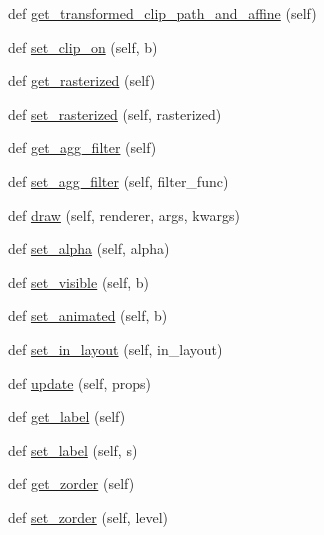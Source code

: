 \begin{DoxyCompactItemize}
\item 
def \hyperlink{classmatplotlib_1_1artist_1_1Artist_a630123b5eb889fc9da7799f3a2faf0bb}{get\+\_\+transformed\+\_\+clip\+\_\+path\+\_\+and\+\_\+affine} (self)
\item 
def \hyperlink{classmatplotlib_1_1artist_1_1Artist_a6179b34cff92122ad9a30a864394638f}{set\+\_\+clip\+\_\+on} (self, b)
\item 
def \hyperlink{classmatplotlib_1_1artist_1_1Artist_aa4ed081e04ee89fd45e5c959018e9031}{get\+\_\+rasterized} (self)
\item 
def \hyperlink{classmatplotlib_1_1artist_1_1Artist_a871b52481eb940ebea0bbb4a9c337f3d}{set\+\_\+rasterized} (self, rasterized)
\item 
def \hyperlink{classmatplotlib_1_1artist_1_1Artist_ab61bb9708059e996384165190df83c5d}{get\+\_\+agg\+\_\+filter} (self)
\item 
def \hyperlink{classmatplotlib_1_1artist_1_1Artist_a5cc2db96730cb274f965afd3f58d719e}{set\+\_\+agg\+\_\+filter} (self, filter\+\_\+func)
\item 
def \hyperlink{classmatplotlib_1_1artist_1_1Artist_a5ed9a21a1ca45a835ea296f654ae9d35}{draw} (self, renderer, args, kwargs)
\item 
def \hyperlink{classmatplotlib_1_1artist_1_1Artist_ac40011e4ebbc7ecf8816e94d04e5ebe1}{set\+\_\+alpha} (self, alpha)
\item 
def \hyperlink{classmatplotlib_1_1artist_1_1Artist_a19047f5854731d1aa26bd867515dfb29}{set\+\_\+visible} (self, b)
\item 
def \hyperlink{classmatplotlib_1_1artist_1_1Artist_ac906bf262f0ebe34445cca570697184e}{set\+\_\+animated} (self, b)
\item 
def \hyperlink{classmatplotlib_1_1artist_1_1Artist_ad584ec289f20e8ec9a80ebad59f988f8}{set\+\_\+in\+\_\+layout} (self, in\+\_\+layout)
\item 
def \hyperlink{classmatplotlib_1_1artist_1_1Artist_a9c412b279349ff90f4dc1559460907e2}{update} (self, props)
\item 
def \hyperlink{classmatplotlib_1_1artist_1_1Artist_a93f1d4dcb16881c08cd95d50827901f8}{get\+\_\+label} (self)
\item 
def \hyperlink{classmatplotlib_1_1artist_1_1Artist_a5f421b761e4d02ae717836ad812391e1}{set\+\_\+label} (self, s)
\item 
def \hyperlink{classmatplotlib_1_1artist_1_1Artist_ad9c180894edb84c61d901ba395379ebb}{get\+\_\+zorder} (self)
\item 
def \hyperlink{classmatplotlib_1_1artist_1_1Artist_a49b2c2a2d8eba1198a6cbd9285e44cac}{set\+\_\+zorder} (self, level)

\end{DoxyCompactItemize}
